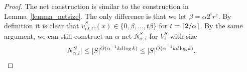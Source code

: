 \documentclass[11pt,letterpaper]{article}
\theoremstyle{definition}
\DeclareMathOperator{\dist}{dist}
\DeclarePairedDelimiter{\abs}{\lvert}{\rvert}
\DeclarePairedDelimiter{\ceil}{\lceil}{\rceil}
\begin{document}
\begin{proof}

%
The net construction is similar to the construction in Lemma~\ref{lemma_netsize}. 
%    
The only difference is that we let $\beta = \alpha 
2^{i} r^z$. 
%
By definition it is clear that $\tilde{v}_{iJ,C}^S(x) \in \{0,\beta,...,t\beta  \}$ for $t=\ceil{2 /\alpha}$. 
%
By the same argument, we can still construct an $\alpha$-net $N_{\alpha,i}^S$ for $V_i^S$ with size
\[
\abs{N_{\alpha,i}^S} \leq \abs{S}^{O(\alpha^{-1} kd \log k)} \leq \abs{S}^{O(\alpha^{-1} kd \log k)}.
\]
%    


\end{proof}
\end{document}
